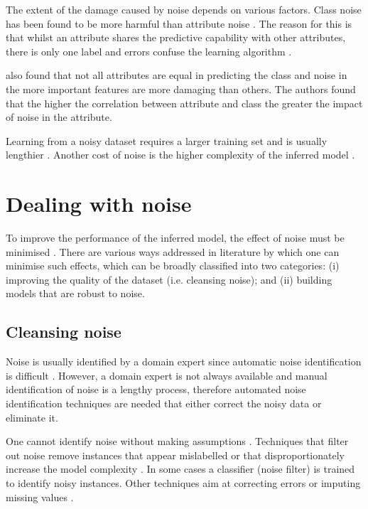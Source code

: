 The extent of the damage caused by noise depends on various factors.  Class noise has been found to be more harmful than attribute noise \citep{zhu2004class}.  The reason for this is that whilst an attribute shares the predictive capability with other attributes, there is only one label and errors confuse the learning algorithm  \citep{zhu2004class}. 

\citet{zhu2004class} also found that not all attributes are equal in predicting the class and noise in the more important features are more damaging than others. The authors found that the higher the correlation between attribute and class the greater the impact of noise in the attribute.

Learning from a noisy dataset requires a larger training set \citep{frenay2014comprehensive, frenay2014classification} and is usually lengthier \citep{garcia2013}. Another cost of noise is the higher complexity of the inferred model \citep{garcia2013, frenay2014comprehensive, frenay2014classification}.

\section{Dealing with noise}\label{sec:noise_dealing}

To improve the performance of the inferred model, the effect of noise must be minimised \citep{zhu2004class}. There are various ways addressed in literature by which one can minimise such effects, which can be broadly classified into two categories: (i) improving the quality of the dataset (i.e. cleansing noise); and (ii) building models that are robust to noise.

\subsection{Cleansing noise}\label{sec:noise_cleansing}

Noise is usually identified by a domain expert since automatic noise identification is difficult \citep{garcia2013}.  However, a domain expert is not always available and manual identification of noise is a lengthy process, therefore automated noise identification techniques are needed that either correct the noisy data or eliminate it. 

One cannot identify noise without making assumptions \citep{frenay2014classification}. Techniques that filter out noise remove instances that appear mislabelled or that disproportionately increase the model complexity \citep{frenay2014comprehensive}.  In some cases a classifier (noise filter) is trained to identify noisy instances. Other techniques aim at correcting errors or imputing missing values \citep{zhu2004class}.

